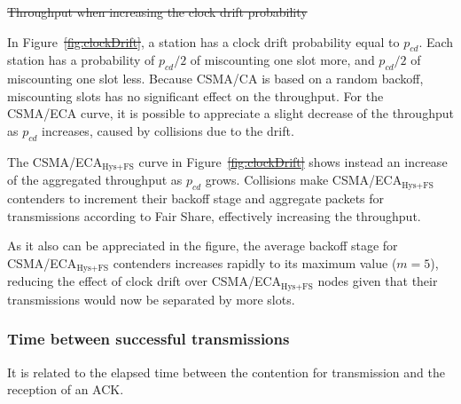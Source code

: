 \documentclass[a4paper,journal]{IEEEtran}
\providecommand{\DIFaddtex}[1]{{\protect\color{blue}\uwave{#1}}} %
\providecommand{\DIFdeltex}[1]{{\protect\color{red}\sout{#1}}}                      %
\providecommand{\DIFaddbegin}{} %
\providecommand{\DIFaddend}{} %
\providecommand{\DIFdelbegin}{} %
\providecommand{\DIFdelend}{} %
\providecommand{\DIFdelFL}[1]{\DIFdel{#1}} %
\providecommand{\DIFadd}[1]{\texorpdfstring{\DIFaddtex{#1}}{#1}} %
\providecommand{\DIFdel}[1]{\texorpdfstring{\DIFdeltex{#1}}{}} %
\begin{document}
\DIFdelbegin %
{%
\DIFdelFL{Throughput when increasing the clock drift probability}}
\DIFdelend %

	In Figure~\DIFdelbegin \DIFdel{\ref{fig:clockDrift}}\DIFdelend \DIFaddbegin \DIFadd{\ref{fig:satResults}e}\DIFaddend , a station has a clock drift probability equal to $p_{cd}$. Each station has a probability of $p_{cd}/2$ of miscounting one slot more, and $p_{cd}/2$ of miscounting one slot less. Because CSMA/CA is based on a random backoff, miscounting slots has no significant effect on the throughput. For the CSMA/ECA curve, it is possible to appreciate a slight decrease of the throughput as $p_{cd}$ increases, caused by collisions due to the drift.

	The CSMA/ECA$_{\text{Hys+FS}}$ curve in Figure~\DIFdelbegin \DIFdel{\ref{fig:clockDrift} }\DIFdelend \DIFaddbegin \DIFadd{\ref{fig:satResults}e }\DIFaddend shows instead an increase of the aggregated throughput as $p_{cd}$ grows. Collisions make CSMA/ECA$_{\text{Hys+FS}}$ contenders to increment their backoff stage and aggregate packets for transmissions according to Fair Share, effectively increasing the throughput. 

	As it also can be appreciated in the figure, the average backoff stage for CSMA/ECA$_{\text{Hys+FS}}$ contenders increases rapidly to its maximum value ($m=5$), reducing the effect of clock drift over CSMA/ECA$_{\text{Hys+FS}}$ nodes given that their transmissions would now be separated by more slots.\\

	\subsubsection{Time between successful transmissions}\label{timeBetweenSxTx}
	It is related to the elapsed time between the contention for transmission and the reception of an ACK.
\end{document}
